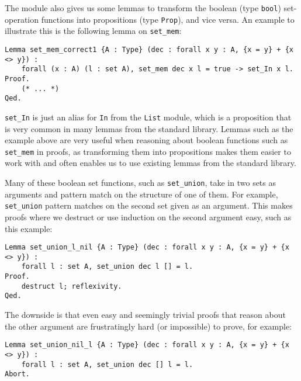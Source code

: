 The module also gives us some lemmas to transform the boolean (type \lstinline{bool}) set-operation functions into
propositions (type \lstinline{Prop}), and vice versa. An example to illustrate this is the following lemma on \lstinline{set_mem}:

\begin{minipage}{\linewidth}
\begin{lstlisting}[language=Coq, label={lst:set_mem_correct1}, caption={\lstinline{set_mem} lemma in \lstinline{ListSet} module}]
Lemma set_mem_correct1 {A : Type} (dec : forall x y : A, {x = y} + {x <> y}) :
    forall (x : A) (l : set A), set_mem dec x l = true -> set_In x l.
Proof.
    (* ... *)
Qed.
\end{lstlisting}
\end{minipage}

\lstinline{set_In} is just an alias for \lstinline{In} from the \lstinline{List} module,
which is a proposition that is very common in many lemmas from the standard library.
Lemmas such as the example above are very useful when reasoning about boolean functions such as
\lstinline{set_mem} in proofs, as transforming them into propositions makes them easier to work with
and often enables us to use existing lemmas from the standard library.

Many of these boolean set functions, such as \lstinline{set_union},
take in two sets as arguments and pattern match on the structure of one of them.
For example, \lstinline{set_union} pattern matches on the second set given as an argument.
This makes proofs where we destruct or use induction on the second argument easy, such as this example:

\begin{minipage}{\linewidth}
\begin{lstlisting}[language=Coq, label={lst:set_op_ex1}, caption={Easy proof of lemma in \lstinline{ListSet} module}]
Lemma set_union_l_nil {A : Type} (dec : forall x y : A, {x = y} + {x <> y}) :
    forall l : set A, set_union dec l [] = l.
Proof.
    destruct l; reflexivity.
Qed.
\end{lstlisting}
\end{minipage}

The downside is that even easy and seemingly trivial proofs that reason about the other argument are frustratingly hard
(or impossible) to prove, for example:

\begin{minipage}{\linewidth}
\begin{lstlisting}[language=Coq, label={lst:set_op_ex2}, caption={Wrong lemma in \lstinline{ListSet} module}]
Lemma set_union_nil_l {A : Type} (dec : forall x y : A, {x = y} + {x <> y}) :
    forall l : set A, set_union dec [] l = l.
Abort.
\end{lstlisting}
\end{minipage}

